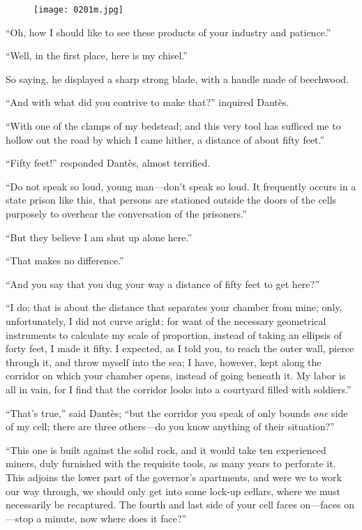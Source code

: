 \begin{figure}[ht]
\texttt{[image: 0201m.jpg]}
\end{figure}

“Oh, how I should like to see these products of your industry and
patience.”

“Well, in the first place, here is my chisel.”

So saying, he displayed a sharp strong blade, with a handle made of
beechwood.

“And with what did you contrive to make that?” inquired Dantès.

“With one of the clamps of my bedstead; and this very tool has sufficed
me to hollow out the road by which I came hither, a distance of about
fifty feet.”

“Fifty feet!” responded Dantès, almost terrified.

“Do not speak so loud, young man—don’t speak so loud. It frequently
occurs in a state prison like this, that persons are stationed outside
the doors of the cells purposely to overhear the conversation of the
prisoners.”

“But they believe I am shut up alone here.”

“That makes no difference.”

“And you say that you dug your way a distance of fifty feet to get
here?”

“I do; that is about the distance that separates your chamber from
mine; only, unfortunately, I did not curve aright; for want of the
necessary geometrical instruments to calculate my scale of proportion,
instead of taking an ellipsis of forty feet, I made it fifty. I
expected, as I told you, to reach the outer wall, pierce through it,
and throw myself into the sea; I have, however, kept along the corridor
on which your chamber opens, instead of going beneath it. My labor is
all in vain, for I find that the corridor looks into a courtyard filled
with soldiers.”

“That’s true,” said Dantès; “but the corridor you speak of only bounds
\textit{one} side of my cell; there are three others—do you know anything of
their situation?”

“This one is built against the solid rock, and it would take ten
experienced miners, duly furnished with the requisite tools, as many
years to perforate it. This adjoins the lower part of the governor’s
apartments, and were we to work our way through, we should only get
into some lock-up cellars, where we must necessarily be recaptured. The
fourth and last side of your cell faces on—faces on—stop a minute, now
where does it face?”

